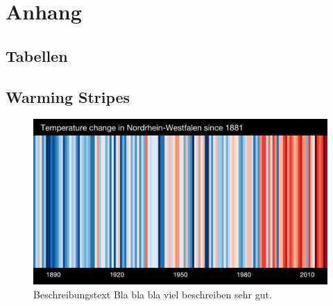 \chapter*{Anhang}
\setcounter{figure}{0}
\renewcommand{\thefigure}{\Alph{section}.\arabic{figure}}
\renewcommand{\thesection}{\Alph{section}} 
\setcounter{table}{0}
\renewcommand\thetable{\Alph{section}.\arabic{table}}

\section{Tabellen}


\section{Warming Stripes}
\begin{figure}[htbp]
	\centering
	\includegraphics[width=\textwidth]{anhang/_stripes_EUROPE-Germany-Nordrhein_Westfalen-1881-2019-DW-withlabels.png}
	\caption[Titel der Figure]{Beschreibungstext Bla bla bla viel beschreiben sehr gut. \cite{Hawkins.2019}}
	\label{fig:DieLableIhAuhhNooo}
\end{figure}
